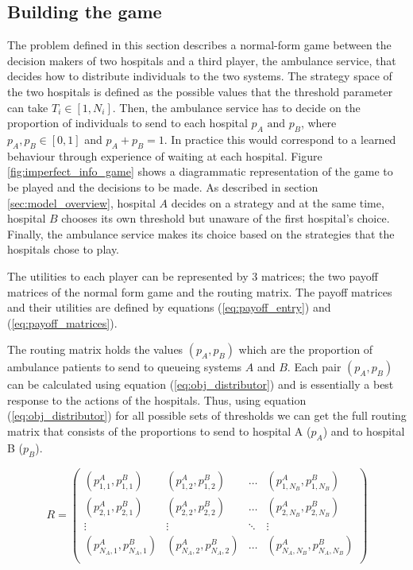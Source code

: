 \subsection{Building the game}\label{sec:methodology}

The problem defined in this section describes a normal-form
game between the decision makers of two hospitals and a third player, the 
ambulance service, that 
decides how to distribute individuals to the two systems.
The strategy space of the two hospitals is defined as the possible values
that the threshold parameter can take \(T_i \in [1, N_i]\).
Then, the ambulance service has to decide on the proportion of individuals to 
send to 
each hospital \(p_A \text{ and } p_B\), where \(p_A, p_B \in [0, 1] \)
and \(p_A + p_B = 1\).
In practice this would correspond to a learned behaviour through experience of
waiting at each hospital.
Figure \ref{fig:imperfect_info_game} 
shows a diagrammatic representation of the game to be played and the decisions 
to be made.
As described in section \ref{sec:model_overview}, hospital \(A\) decides
on a strategy and at the same time, hospital \(B\) chooses its own 
threshold but unaware of the first hospital's choice.
Finally, the ambulance service makes its choice based on the strategies that the 
hospitals chose to play. 

The utilities to each player can be represented by 3 matrices; the two payoff 
matrices of the normal form game and the routing matrix.
The payoff matrices and their utilities are defined by equations 
(\ref{eq:payoff_entry}) and (\ref{eq:payoff_matrices}).

The routing matrix holds the values \((p_A, p_B)\) which are the proportion 
of ambulance patients to send to queueing systems \(A\) and \(B\).
Each pair \((p_A, p_B)\) can be calculated using equation 
(\ref{eq:obj_distributor}) and is essentially
a best response to the actions of the hospitals.
Thus, using equation (\ref{eq:obj_distributor}) for all possible sets of 
thresholds we can get the full routing matrix that consists of the proportions
to send to hospital A (\(p_A\)) and to hospital B (\(p_B\)).

\begin{equation}\label{eq:routing_matrix}
    R = 
    \begin{pmatrix}
        (p_{1,1}^A, p_{1,1}^B) & (p_{1,2}^A, p_{1,2}^B) & \dots & 
        (p_{1,N_B}^A, p_{1,N_B}^B) \\
        (p_{2,1}^A, p_{2,1}^B) & (p_{2,2}^A, p_{2,2}^B) & \dots & 
        (p_{2,N_B}^A, p_{2,N_B}^B) \\
        \vdots & \vdots & \ddots & \vdots \\
        (p_{N_A,1}^A, p_{N_A,1}^B) & (p_{N_A,2}^A, p_{N_A,2}^B) & \dots & 
        (p_{N_A,N_B}^A, p_{N_A,N_B}^B) \\
    \end{pmatrix}
\end{equation}

